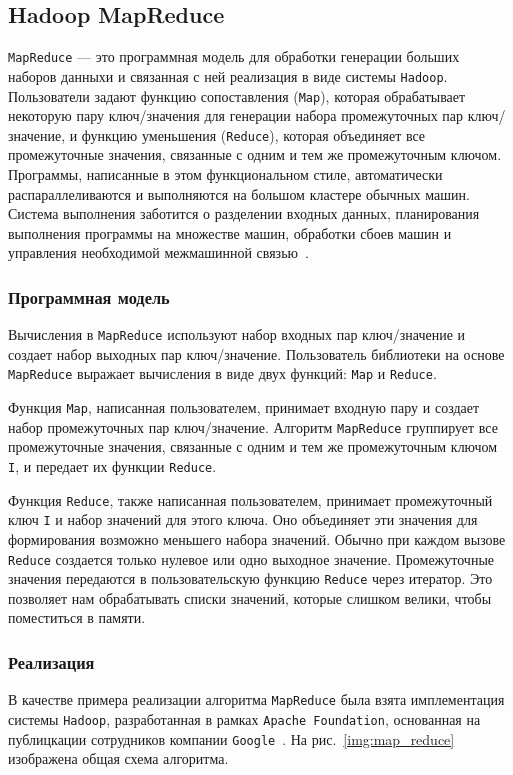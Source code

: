 \subsection{Hadoop MapReduce}

\texttt{MapReduce} --- это программная модель для обработки генерации больших наборов данныхи и связанная с ней реализация в виде системы \texttt{Hadoop}.
Пользователи задают функцию сопоставления (\texttt{Map}), которая обрабатывает некоторую пару ключ/значения для генерации набора промежуточных пар ключ/значение, и функцию уменьшения (\texttt{Reduce}), которая объединяет все промежуточные значения, связанные с одним и тем же промежуточным ключом. 
Программы, написанные в этом функциональном стиле, автоматически распараллеливаются и выполняются на большом кластере обычных машин. 
Система выполнения заботится о разделении входных данных, планирования выполнения программы на множестве машин, обработки сбоев машин и управления необходимой межмашинной связью~\cite{google-mapreduce}.
\subsubsection{Программная модель}

Вычисления в \texttt{MapReduce} используют набор входных пар ключ/значение и создает набор выходных пар ключ/значение. 
Пользователь библиотеки на основе \texttt{MapReduce} выражает вычисления в виде двух функций: \texttt{Map} и \texttt{Reduce}.

Функция \texttt{Map}, написанная пользователем, принимает входную пару и создает набор промежуточных пар ключ/значение. 
Алгоритм \texttt{MapReduce} группирует все промежуточные значения, связанные с одним и тем же промежуточным ключом \texttt{I}, и передает их функции \texttt{Reduce}.

Функция \texttt{Reduce}, также написанная пользователем, принимает промежуточный ключ \texttt{I} и набор значений для этого ключа. 
Оно объединяет эти значения для формирования возможно меньшего набора значений. 
Обычно при каждом вызове \texttt{Reduce} создается только нулевое или одно выходное значение. 
Промежуточные значения передаются в пользовательскую функцию \texttt{Reduce} через итератор.
Это позволяет нам обрабатывать списки значений, которые слишком велики, чтобы поместиться в памяти.

\subsubsection{Реализация}
В качестве примера реализации алгоритма \texttt{MapReduce} была взята имплементация системы \texttt{Hadoop}, разработанная в рамках \texttt{Apache Foundation}, основанная на публицкации сотрудников компании \texttt{Google}~\cite{google-mapreduce}.
На рис.~\ref{img:map_reduce} изображена общая схема алгоритма.%

